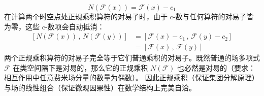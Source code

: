 \begin{equation*}
    N(\mathscr{F}(x)) = \mathscr{F}(x) - c_1
\end{equation*}
在计算两个时空点处正规乘积算符的对易子时，由于 c-数与任何算符的对易子皆为零，这些 c-数项会自动抵消：
\begin{equation*}
\begin{aligned}
    \left[ N(\mathscr{F}(x)) \,,\, N(\mathscr{F}(y)) \right] 
    &= \left[ \mathscr{F}(x) - c_1 \,,\, \mathscr{F}(y) - c_2 \right] \\
    &= \left[ \mathscr{F}(x) \,,\, \mathscr{F}(y) \right]
\end{aligned}
\end{equation*}
两个正规乘积算符的对易子完全等于它们普通乘积的对易子。既然普通的场多项式 $\mathscr{F}$ 在类空间隔下是对易的，那么它的正规乘积 $N(\mathscr{F})$ 也必然是对易的（要求：相互作用中任意费米场分量的数量为偶数）。 因此正规乘积（保证集团分解原理）与场的线性组合（保证微观因果性）在数学结构上完美自洽。
